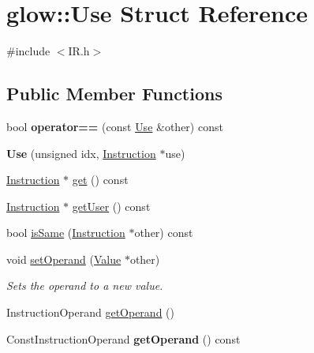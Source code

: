 \hypertarget{structglow_1_1_use}{}\section{glow\+:\+:Use Struct Reference}
\label{structglow_1_1_use}


{\ttfamily \#include $<$I\+R.\+h$>$}

\subsection*{Public Member Functions}
\begin{DoxyCompactItemize}
\item 
\mbox{\label{structglow_1_1_use_a19370d5dc50923923fe287b525833be4}} 
bool {\bfseries operator==} (const \hyperlink{structglow_1_1_use}{Use} \&other) const
\item 
\mbox{\label{structglow_1_1_use_a7925a3748ebed45dadae5e4f3b59def6}} 
{\bfseries Use} (unsigned idx, \hyperlink{classglow_1_1_instruction}{Instruction} $\ast$use)
\item 
\hyperlink{classglow_1_1_instruction}{Instruction} $\ast$ \hyperlink{structglow_1_1_use_a5cea7164405ca05e95eae7d516d1f412}{get} () const
\item 
\hyperlink{classglow_1_1_instruction}{Instruction} $\ast$ \hyperlink{structglow_1_1_use_a2625c7dfb47805d15247b041f787fa01}{get\+User} () const
\item 
bool \hyperlink{structglow_1_1_use_aa6d1ae2ad6ba793289f0df77fbe31ef4}{is\+Same} (\hyperlink{classglow_1_1_instruction}{Instruction} $\ast$other) const
\item 
\mbox{\label{structglow_1_1_use_aef9239432df2fb6731d21b4e23538034}} 
void \hyperlink{structglow_1_1_use_aef9239432df2fb6731d21b4e23538034}{set\+Operand} (\hyperlink{classglow_1_1_value}{Value} $\ast$other)
\begin{DoxyCompactList}\small\item\em Sets the operand to a new value. \end{DoxyCompactList}\item 
Instruction\+Operand \hyperlink{structglow_1_1_use_ade9da8a3f564786ec28fdca26044d07c}{get\+Operand} ()
\item 
\mbox{\label{structglow_1_1_use_ab85d30ee267faacdbf24c9531114b484}} 
Const\+Instruction\+Operand {\bfseries get\+Operand} () const
\end{DoxyCompactItemize}
